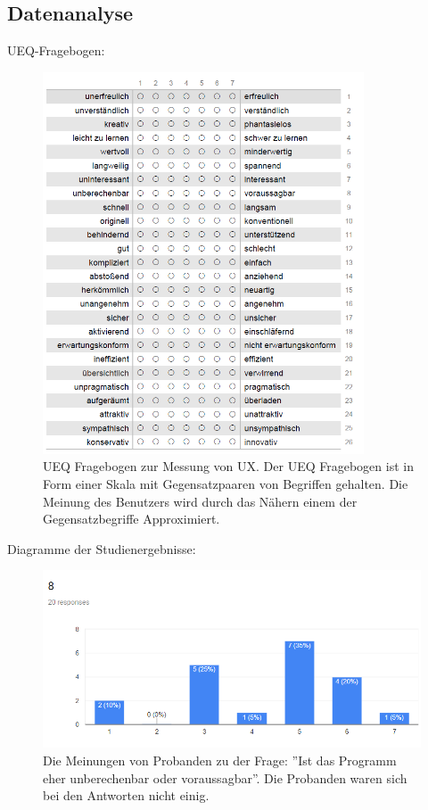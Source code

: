 \subsection{Datenanalyse}
UEQ-Fragebogen:
\begin{figure}[!ht]
    \centering\includegraphics[width=270pt]{res/ueq.png}
\caption{UEQ Fragebogen zur Messung von UX. Der UEQ Fragebogen ist in Form einer Skala mit Gegensatzpaaren von Begriffen gehalten. Die Meinung des Benutzers wird durch das Nähern einem der Gegensatzbegriffe Approximiert.}
\label{ueq}
\end{figure}
\newpage
Diagramme der Studienergebnisse:
\begin{figure}[!ht]
    \centering\includegraphics[width=340pt]{res/8_ueq}
\caption{Die Meinungen von Probanden zu der Frage: ''Ist das Programm eher unberechenbar oder voraussagbar''. Die Probanden waren sich bei den Antworten nicht einig.}
\label{item_8}
\end{figure}

